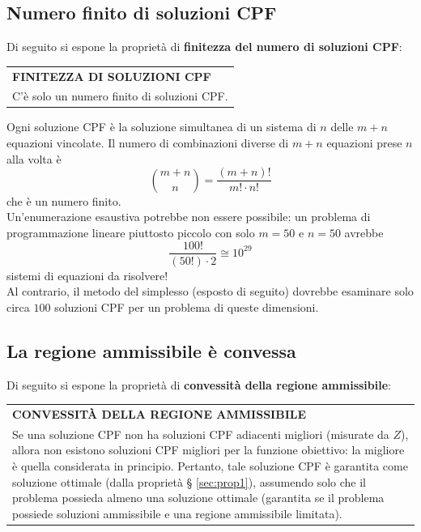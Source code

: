 \documentclass[a4paper]{extarticle}
\renewcommand\arraystretch{}
\begin{document}
\subsection{Numero finito di soluzioni CPF}
Di seguito si espone la proprietà di \textbf{finitezza del numero di soluzioni CPF}:

\vspace{1em}
\setlength{\tabcolsep}{14pt}
\renewcommand{\arraystretch}{2}
\noindent
\begin{tabularx}{\textwidth}{@{}|P|@{}}
    \hline
    {\textbf{FINITEZZA DI SOLUZIONI CPF}}\\
    \parbox{\linewidth}{C'è solo un numero finito di soluzioni CPF. \vspace{3mm}}\\
    \hline
\end{tabularx}

\vspace{1em}
\noindent
Ogni soluzione CPF è la soluzione simultanea di un sistema di $n$ delle $m+n$ equazioni vincolate. Il numero di combinazioni diverse di $m + n$ equazioni prese $n$ alla volta è
\[\binom{m+n}{n} = \frac{(m+n)!}{m! \cdot n!}\]
che è un numero finito.\\
Un'enumerazione esaustiva potrebbe non essere possibile: un problema di programmazione lineare piuttosto piccolo con
solo $m = 50$ e $n = 50$ avrebbe 
\[\frac{100!}{(50!) \cdot 2} \cong 10^{29}\]
sistemi di equazioni da risolvere!\\
Al contrario, il metodo del simplesso (esposto di seguito) dovrebbe esaminare solo circa $100$ soluzioni CPF per un problema di queste dimensioni.

\vspace{1em}
\subsection{La regione ammissibile è convessa}
Di seguito si espone la proprietà di \textbf{convessità della regione ammissibile}:

\vspace{1em}
\setlength{\tabcolsep}{14pt}
\renewcommand{\arraystretch}{2}
\noindent
\begin{tabularx}{\textwidth}{@{}|P|@{}}
    \hline
    {\textbf{CONVESSITÀ DELLA REGIONE AMMISSIBILE}}\\
    \parbox{\linewidth}{Se una soluzione CPF non ha soluzioni CPF adiacenti migliori (misurate da $Z$), allora non esistono soluzioni CPF migliori per la funzione obiettivo: la migliore è quella considerata in principio.\\
    Pertanto, tale soluzione CPF è garantita come soluzione ottimale (dalla proprietà § \ref{sec:prop1}), assumendo solo che il problema possieda almeno una soluzione ottimale (garantita se il problema possiede soluzioni ammissibile e una regione ammissibile limitata). \vspace{3mm}}\\
    \hline
\end{tabularx}
\end{document}
